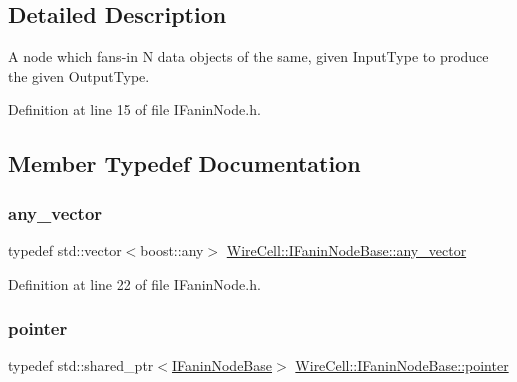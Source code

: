 \subsection{Detailed Description}
A node which fans-\/in N data objects of the same, given Input\+Type to produce the given Output\+Type. 

Definition at line 15 of file I\+Fanin\+Node.\+h.



\subsection{Member Typedef Documentation}
\mbox{\label{class_wire_cell_1_1_i_fanin_node_base_a9dc315fe5b56f41f13ea247fc4b7f34b}} 
\subsubsection{\texorpdfstring{any\+\_\+vector}{any\_vector}}
{\footnotesize\ttfamily typedef std\+::vector$<$boost\+::any$>$ \hyperlink{class_wire_cell_1_1_i_fanin_node_base_a9dc315fe5b56f41f13ea247fc4b7f34b}{Wire\+Cell\+::\+I\+Fanin\+Node\+Base\+::any\+\_\+vector}}



Definition at line 22 of file I\+Fanin\+Node.\+h.

\mbox{\label{class_wire_cell_1_1_i_fanin_node_base_ad68050255fd53c8b9a129083299bca2d}} 
\subsubsection{\texorpdfstring{pointer}{pointer}}
{\footnotesize\ttfamily typedef std\+::shared\+\_\+ptr$<$\hyperlink{class_wire_cell_1_1_i_fanin_node_base}{I\+Fanin\+Node\+Base}$>$ \hyperlink{class_wire_cell_1_1_i_fanin_node_base_ad68050255fd53c8b9a129083299bca2d}{Wire\+Cell\+::\+I\+Fanin\+Node\+Base\+::pointer}}



